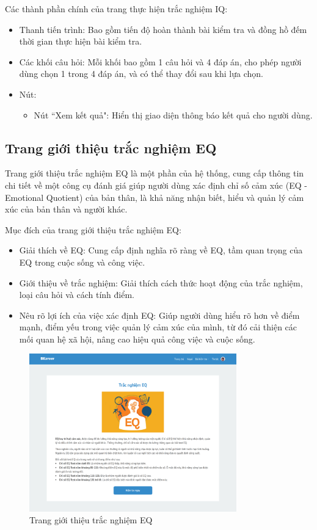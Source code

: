 Các thành phần chính của trang thực hiện trắc nghiệm IQ:
\begin{itemize}
    \item Thanh tiến trình: Bao gồm tiến độ hoàn thành bài kiểm tra và đồng hồ đếm thời gian thực hiện bài kiểm tra.
    \item Các khối câu hỏi: Mỗi khối bao gồm 1 câu hỏi và 4 đáp án, cho phép người dùng chọn 1 trong 4 đáp án, và có thể thay đổi sau khi lựa chọn.
    \item Nút:
        \begin{itemize}
            \item Nút ``Xem kết quả": Hiển thị giao diện thông báo kết quả cho người dùng.
        \end{itemize}
\end{itemize}


\subsection{Trang giới thiệu trắc nghiệm EQ}
Trang giới thiệu trắc nghiệm EQ là một phần của hệ thống, cung cấp thông tin chi tiết về một công cụ đánh giá giúp người dùng xác định chỉ số cảm xúc (EQ - Emotional Quotient) của bản thân, là khả năng nhận biết, hiểu và quản lý cảm xúc của bản thân và người khác.

Mục đích của trang giới thiệu trắc nghiệm EQ:
\begin{itemize}
    \item Giải thích về EQ: Cung cấp định nghĩa rõ ràng về EQ, tầm quan trọng của EQ trong cuộc sống và công việc.
    \item Giới thiệu về trắc nghiệm: Giải thích cách thức hoạt động của trắc nghiệm, loại câu hỏi và cách tính điểm.
    \item Nêu rõ lợi ích của việc xác định EQ: Giúp người dùng hiểu rõ hơn về điểm mạnh, điểm yếu trong việc quản lý cảm xúc của mình, từ đó cải thiện các mối quan hệ xã hội, nâng cao hiệu quả công việc và cuộc sống.
\end{itemize}

\begin{figure}[H]
    \centering
    \includegraphics[width=0.8\textwidth]
    {images/chap5/eqDetail.png}
    \vspace{0.5cm}
    \caption{Trang giới thiệu trắc nghiệm EQ}
\end{figure}

